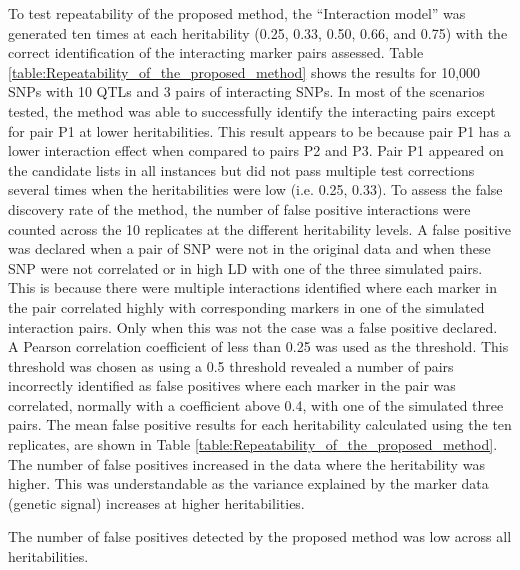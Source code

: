\documentclass[preprint,12pt,3p]{elsarticle}
\begin{document}
To test repeatability of the proposed method, the ``Interaction model'' was generated ten times at each heritability
(0.25, 0.33, 0.50, 0.66, and 0.75) with the correct identification of the interacting marker pairs assessed. Table
\ref{table:Repeatability_of_the_proposed_method} shows the results for 10,000 SNPs with 10 QTLs and 3 pairs of
interacting SNPs. In most of the scenarios tested, the method was able to successfully identify the interacting pairs
except for pair P1 at lower heritabilities. This result appears to be because pair P1 has a lower interaction effect
when compared to pairs P2 and P3. Pair P1 appeared on the candidate lists in all instances but did not pass multiple
test corrections several times when the heritabilities were low (i.e. 0.25, 0.33).  To assess the false discovery rate of
the method, the number of false positive interactions were counted across the 10 replicates at the different
heritability levels. A false positive was declared when a pair of SNP were not in the original data and when these SNP
were not correlated or in high LD with one of the three simulated pairs. This is because there were multiple
interactions identified where each marker in the pair correlated highly with corresponding markers in one of the
simulated interaction pairs.  Only when this was not the case was a false positive declared. A Pearson correlation
coefficient of less than 0.25 was used as the threshold. This threshold was chosen as using a 0.5 threshold revealed a
number of pairs incorrectly identified as false positives where each marker in the pair was correlated, normally with a
coefficient above 0.4, with one of the simulated three pairs. The mean false positive results for each heritability
calculated using the ten replicates, are shown in Table \ref{table:Repeatability_of_the_proposed_method}. The number of
false positives increased in the data where the heritability was higher. This was understandable as the variance
explained by the marker data (genetic signal) increases at higher heritabilities.

The number of false positives detected by the proposed method was low across all heritabilities.
\end{document}
